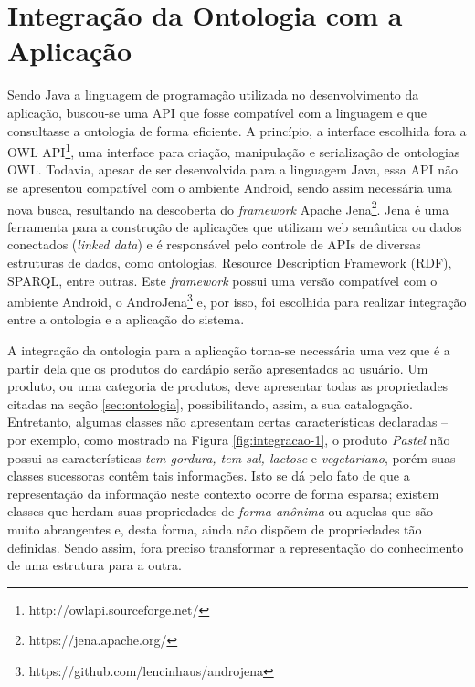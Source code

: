 \section{Integração da Ontologia com a Aplicação}

Sendo Java a linguagem de programação utilizada no desenvolvimento da aplicação, buscou-se uma API que fosse compatível com a linguagem e que consultasse a ontologia de forma eficiente. A princípio, a interface escolhida fora a OWL API\footnote{http://owlapi.sourceforge.net/}, uma interface para criação, manipulação e serialização de ontologias OWL. Todavia, apesar de ser desenvolvida para a linguagem Java, essa API não se apresentou compatível com o ambiente Android, sendo assim necessária uma nova busca, resultando na descoberta do \emph{framework} Apache Jena\footnote{https://jena.apache.org/}. Jena é uma ferramenta para a construção de aplicações que utilizam web semântica ou dados conectados (\emph{linked data}) e é responsável pelo controle de APIs de diversas estruturas de dados, como ontologias, Resource Description Framework (RDF), SPARQL, entre outras. Este \emph{framework} possui uma versão compatível com o ambiente Android, o AndroJena\footnote{https://github.com/lencinhaus/androjena} e, por isso, foi escolhida para realizar integração entre a ontologia e a aplicação do sistema.

A integração da ontologia para a aplicação torna-se necessária uma vez que é a partir dela que os produtos do cardápio serão apresentados ao usuário. Um produto, ou uma categoria de produtos, deve apresentar todas as propriedades citadas na seção \ref{sec:ontologia}, possibilitando, assim, a sua catalogação. Entretanto, algumas classes não apresentam certas características declaradas -- por exemplo, como mostrado na Figura \ref{fig:integracao-1}, o produto \emph{Pastel} não possui as características \emph{tem gordura, tem sal, lactose} e \emph{vegetariano}, porém suas classes sucessoras contêm tais informações. Isto se dá pelo fato de que a representação da informação neste contexto ocorre de forma esparsa; existem classes que herdam suas propriedades de \emph{forma anônima} ou aquelas que são muito abrangentes e, desta forma, ainda não dispõem de propriedades tão definidas. Sendo assim, fora preciso transformar a representação do conhecimento de uma estrutura para a outra.

